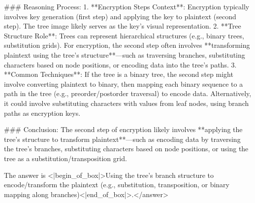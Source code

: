 ### Reasoning Process:  
1. **Encryption Steps Context**: Encryption typically involves key generation (first step) and applying the key to plaintext (second step). The tree image likely serves as the key’s visual representation.  
2. **Tree Structure Role**: Trees can represent hierarchical structures (e.g., binary trees, substitution grids). For encryption, the second step often involves **transforming plaintext using the tree’s structure**—such as traversing branches, substituting characters based on node positions, or encoding data into the tree’s paths.  
3. **Common Techniques**: If the tree is a binary tree, the second step might involve converting plaintext to binary, then mapping each binary sequence to a path in the tree (e.g., preorder/postorder traversal) to encode data. Alternatively, it could involve substituting characters with values from leaf nodes, using branch paths as encryption keys.  

### Conclusion:  
The second step of encryption likely involves **applying the tree’s structure to transform plaintext**—such as encoding data by traversing the tree’s branches, substituting characters based on node positions, or using the tree as a substitution/transposition grid.  

The answer is <|begin_of_box|>Using the tree’s branch structure to encode/transform the plaintext (e.g., substitution, transposition, or binary mapping along branches)<|end_of_box|>.</answer>